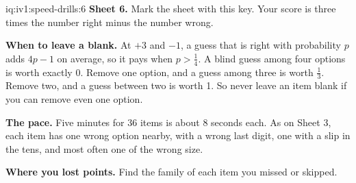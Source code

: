 \enlargethispage{-3\baselineskip}%
\begin{solution}{iq:iv1:speed-drills:6}
\textbf{Sheet 6.} Mark the sheet with this key. Your score is three times the number right minus the number wrong.
\par\nopagebreak


\textbf{When to leave a blank.} At $+3$ and $-1$, a guess that is right with probability $p$ adds $4p - 1$ on average, so it pays when $p > \tfrac14$. A blind guess among four options is worth exactly 0. Remove one option, and a guess among three is worth $\tfrac13$. Remove two, and a guess between two is worth 1. So never leave an item blank if you can remove even one option.

\textbf{The pace.} Five minutes for 36 items is about 8 seconds each. As on Sheet 3, each item has one wrong option nearby, with a wrong last digit, one with a slip in the tens, and most often one of the wrong size.

\textbf{Where you lost points.} Find the family of each item you missed or skipped.


\end{solution}

